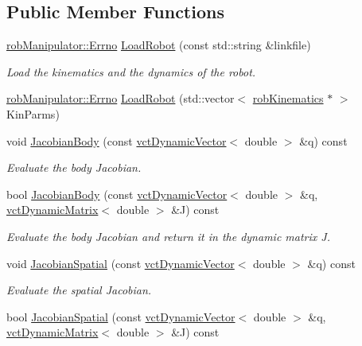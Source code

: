 \subsection*{Public Member Functions}
\begin{DoxyCompactItemize}
\item 
\hyperlink{classrob_manipulator_a7bbb51cdb81c9c681075a9274ca0cdc0}{rob\-Manipulator\-::\-Errno} \hyperlink{classrob_manipulator_afeb544ece26328d3dc013e105b0acdcf}{Load\-Robot} (const std\-::string \&linkfile)
\begin{DoxyCompactList}\small\item\em Load the kinematics and the dynamics of the robot. \end{DoxyCompactList}\item 
\hyperlink{classrob_manipulator_a7bbb51cdb81c9c681075a9274ca0cdc0}{rob\-Manipulator\-::\-Errno} \hyperlink{classrob_manipulator_a6eb3b10e9e5d5f56976bb9da7967efca}{Load\-Robot} (std\-::vector$<$ \hyperlink{classrob_kinematics}{rob\-Kinematics} $\ast$ $>$ Kin\-Parms)
\item 
void \hyperlink{classrob_manipulator_a6b998ea891870822b93d622aa837ecd3}{Jacobian\-Body} (const \hyperlink{classvct_dynamic_vector}{vct\-Dynamic\-Vector}$<$ double $>$ \&q) const 
\begin{DoxyCompactList}\small\item\em Evaluate the body Jacobian. \end{DoxyCompactList}\item 
bool \hyperlink{classrob_manipulator_a00497a527bc3ca87583f7edf6b59986c}{Jacobian\-Body} (const \hyperlink{classvct_dynamic_vector}{vct\-Dynamic\-Vector}$<$ double $>$ \&q, \hyperlink{classvct_dynamic_matrix}{vct\-Dynamic\-Matrix}$<$ double $>$ \&J) const 
\begin{DoxyCompactList}\small\item\em Evaluate the body Jacobian and return it in the dynamic matrix J. \end{DoxyCompactList}\item 
void \hyperlink{classrob_manipulator_a4ba11995ed4b30a2a0d5042281810bc9}{Jacobian\-Spatial} (const \hyperlink{classvct_dynamic_vector}{vct\-Dynamic\-Vector}$<$ double $>$ \&q) const 
\begin{DoxyCompactList}\small\item\em Evaluate the spatial Jacobian. \end{DoxyCompactList}\item 
bool \hyperlink{classrob_manipulator_a8817bbf6ca1921700165b29232aee8ad}{Jacobian\-Spatial} (const \hyperlink{classvct_dynamic_vector}{vct\-Dynamic\-Vector}$<$ double $>$ \&q, \hyperlink{classvct_dynamic_matrix}{vct\-Dynamic\-Matrix}$<$ double $>$ \&J) const 

\end{DoxyCompactItemize}
